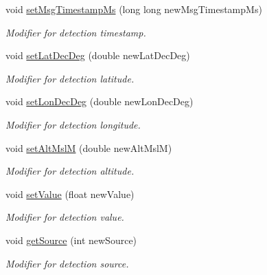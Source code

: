 \begin{DoxyCompactItemize}
void \hyperlink{class_cloud_detection_a974add57b48557bda5825722be6827e4}{setMsgTimestampMs} (long long newMsgTimestampMs)
\begin{DoxyCompactList}\small\item\em Modifier for detection timestamp. \end{DoxyCompactList}\item 
void \hyperlink{class_cloud_detection_acea0d4ecec08d243cec9700d1a23bd82}{setLatDecDeg} (double newLatDecDeg)
\begin{DoxyCompactList}\small\item\em Modifier for detection latitude. \end{DoxyCompactList}\item 
void \hyperlink{class_cloud_detection_afc368a8a313809f2a135583534ddce57}{setLonDecDeg} (double newLonDecDeg)
\begin{DoxyCompactList}\small\item\em Modifier for detection longitude. \end{DoxyCompactList}\item 
void \hyperlink{class_cloud_detection_a57ad9d093b506088c74b718290bcbe91}{setAltMslM} (double newAltMslM)
\begin{DoxyCompactList}\small\item\em Modifier for detection altitude. \end{DoxyCompactList}\item 
void \hyperlink{class_cloud_detection_a977ead331d055c18647e21ab57b53e3d}{setValue} (float newValue)
\begin{DoxyCompactList}\small\item\em Modifier for detection value. \end{DoxyCompactList}\item 
void \hyperlink{class_cloud_detection_aa5382a15a5a87cfc779636426b12258d}{getSource} (int newSource)
\begin{DoxyCompactList}\small\item\em Modifier for detection source. \end{DoxyCompactList}\end{DoxyCompactItemize}
